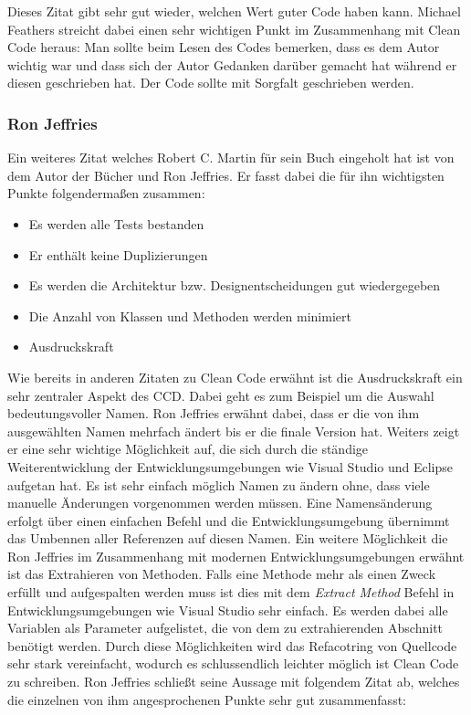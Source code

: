 Dieses Zitat gibt sehr gut wieder, welchen Wert guter Code haben kann. Michael Feathers streicht dabei einen sehr wichtigen Punkt im Zusammenhang mit Clean Code heraus: Man sollte beim Lesen des Codes bemerken, dass es dem Autor wichtig war und dass sich der Autor Gedanken darüber gemacht hat während er diesen geschrieben hat. Der Code sollte mit Sorgfalt geschrieben werden.

\subsubsection{Ron Jeffries}
Ein weiteres Zitat welches Robert C. Martin für sein Buch eingeholt hat ist von dem Autor der Bücher \cite{Jeffries2000} und \cite{Jeffries2004} Ron Jeffries. Er fasst dabei die für ihn wichtigsten Punkte folgendermaßen zusammen:

\begin{itemize}
	\item Es werden alle Tests bestanden
	\item Er enthält keine Duplizierungen
	\item Es werden die Architektur bzw. Designentscheidungen gut wiedergegeben
	\item Die Anzahl von Klassen und Methoden werden minimiert
	\item Ausdruckskraft
\end{itemize}

Wie bereits in anderen Zitaten zu Clean Code erwähnt ist die Ausdruckskraft ein sehr zentraler Aspekt des CCD. Dabei geht es zum Beispiel um die Auswahl bedeutungsvoller Namen. Ron Jeffries erwähnt dabei, dass er die von ihm ausgewählten Namen mehrfach ändert bis er die finale Version hat. Weiters zeigt er eine sehr wichtige Möglichkeit auf, die sich durch die ständige Weiterentwicklung der Entwicklungsumgebungen wie Visual Studio und Eclipse aufgetan hat. Es ist sehr einfach möglich Namen zu ändern ohne, dass viele manuelle Änderungen vorgenommen werden müssen. Eine Namensänderung erfolgt über einen einfachen Befehl und die Entwicklungsumgebung übernimmt das Umbennen aller Referenzen auf diesen Namen. Ein weitere Möglichkeit die Ron Jeffries im Zusammenhang mit modernen Entwicklungsumgebungen erwähnt ist das Extrahieren von Methoden. Falls eine Methode mehr als einen Zweck erfüllt und aufgespalten werden muss ist dies mit dem \textit{Extract Method} Befehl in Entwicklungsumgebungen wie Visual Studio sehr einfach. Es werden dabei alle Variablen als Parameter aufgelistet, die von dem zu extrahierenden Abschnitt benötigt werden. Durch diese Möglichkeiten wird das Refacotring von Quellcode sehr stark vereinfacht, wodurch es schlussendlich leichter möglich ist Clean Code zu schreiben. Ron Jeffries schließt seine Aussage mit folgendem Zitat ab, welches die einzelnen von ihm angesprochenen Punkte sehr gut zusammenfasst:

